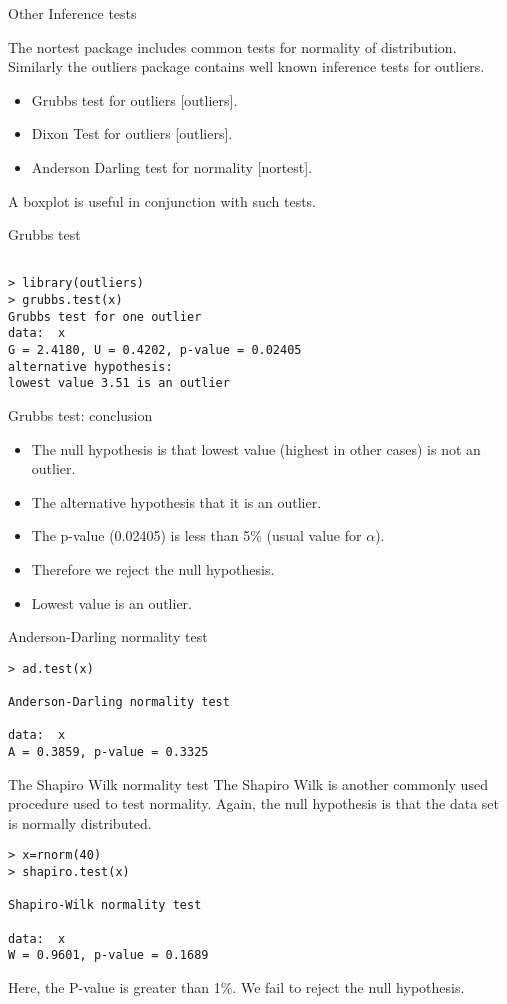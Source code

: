 \documentclass[a4paper,12pt]{article}
\begin{document}

{Other Inference tests}

The nortest package includes common tests for normality of distribution. Similarly the outliers package contains well known inference tests for outliers.

\begin{itemize}
	\item Grubbs test for outliers [outliers].
	\item Dixon Test for outliers [outliers].
	\item Anderson Darling test for normality [nortest].
\end{itemize}
A boxplot is useful in conjunction with such tests.




{Grubbs test}
\begin{verbatim}

> library(outliers)
> grubbs.test(x)
Grubbs test for one outlier
data:  x
G = 2.4180, U = 0.4202, p-value = 0.02405
alternative hypothesis:
lowest value 3.51 is an outlier
\end{verbatim}


{Grubbs test: conclusion}
\begin{itemize}
	\item The null hypothesis is that lowest value (highest in other cases) is not an outlier.
	\item The alternative hypothesis that it is an outlier.
	\item The p-value (0.02405) is less than 5\% (usual value for $\alpha$).
	\item Therefore we reject the null hypothesis.
	\item Lowest value is an outlier.
\end{itemize}

{Anderson-Darling normality test}
\begin{verbatim}
> ad.test(x)

Anderson-Darling normality test

data:  x
A = 0.3859, p-value = 0.3325
\end{verbatim}


{The Shapiro Wilk normality test}
The Shapiro Wilk is another commonly used procedure used to test normality.
Again, the null hypothesis is that the data set is normally distributed.
\begin{verbatim}
> x=rnorm(40)
> shapiro.test(x)

Shapiro-Wilk normality test

data:  x
W = 0.9601, p-value = 0.1689
\end{verbatim}
Here, the P-value is greater than 1\%. We fail to reject the null hypothesis.
\end{document}
